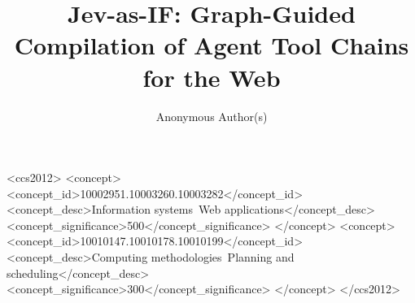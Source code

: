 \documentclass[sigconf,review,anonymous]{acmart}
\begin{document}
\title{Jev-as-IF: Graph-Guided Compilation of Agent Tool Chains for the Web}

\author{Anonymous Author(s)}



\begin{CCSXML}
<ccs2012>
   <concept>
       <concept_id>10002951.10003260.10003282</concept_id>
       <concept_desc>Information systems~Web applications</concept_desc>
       <concept_significance>500</concept_significance>
   </concept>
   <concept>
       <concept_id>10010147.10010178.10010199</concept_id>
       <concept_desc>Computing methodologies~Planning and scheduling</concept_desc>
       <concept_significance>300</concept_significance>
   </concept>
</ccs2012>
\end{CCSXML}


\maketitle














\appendix

\end{document}
